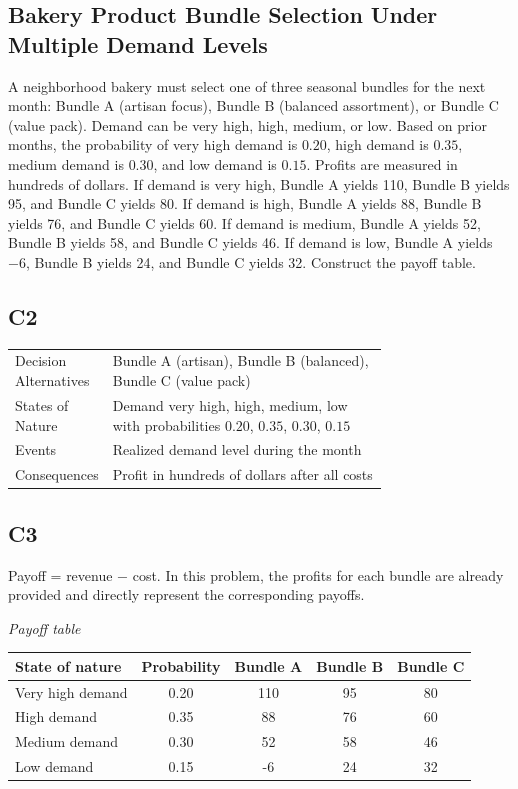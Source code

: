 	\begin{ExamProblems}
		\item
		\section{Bakery Product Bundle Selection Under Multiple Demand Levels}
		A neighborhood bakery must select one of three seasonal bundles for the next month: Bundle A (artisan focus),
		Bundle B (balanced assortment), or Bundle C (value pack). Demand can be very high, high, medium, or low.
		Based on prior months, the probability of very high demand is $0.20$, high demand is $0.35$, medium demand is $0.30$,
		and low demand is $0.15$. Profits are measured in hundreds of dollars. If demand is very high, Bundle A yields 110,
		Bundle B yields 95, and Bundle C yields 80. If demand is high, Bundle A yields 88, Bundle B yields 76, and Bundle C yields 60.
		If demand is medium, Bundle A yields 52, Bundle B yields 58, and Bundle C yields 46. If demand is low, Bundle A yields $-6$,
		Bundle B yields 24, and Bundle C yields 32. Construct the payoff table.
		
		\subsection*{C2}
		\begin{center}
			\begin{tabular}{l p{0.74\linewidth}}
				\toprule
				Decision Alternatives & Bundle A (artisan), Bundle B (balanced), Bundle C (value pack) \\
				States of Nature & Demand very high, high, medium, low with probabilities $0.20$, $0.35$, $0.30$, $0.15$ \\
				Events & Realized demand level during the month \\
				Consequences & Profit in hundreds of dollars after all costs \\
				\bottomrule
			\end{tabular}
		\end{center}
		\subsection*{C3}
		Payoff = revenue $-$ cost. In this problem, the profits for each bundle are already provided and directly represent the corresponding payoffs.
		\begin{center}
			\textit{Payoff table} \\
			\begin{tabular}{l c c c c}
				\toprule
				State of nature & Probability & Bundle A & Bundle B & Bundle C \\
				\midrule
				Very high demand & 0.20 & 110 & 95 & 80 \\
				High demand & 0.35 & 88 & 76 & 60 \\
				Medium demand & 0.30 & 52 & 58 & 46 \\
				Low demand & 0.15 & -6 & 24 & 32 \\
				\bottomrule
			\end{tabular}
		\end{center}
		

\end{ExamProblems}
